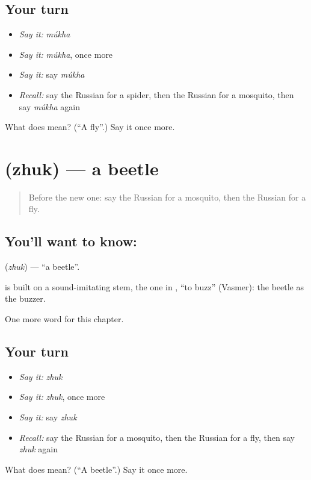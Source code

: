 \subsection*{Your turn}
\begin{itemize}
\raggedright
  \item \emph{Say it:} \emph{múkha}
  \item \emph{Say it:} \emph{múkha}, once more
  \item \emph{Say it:} say \emph{múkha}
  \item \emph{Recall:} say the Russian for a spider, then the Russian for a mosquito, then say \emph{múkha} again
\end{itemize}

\begin{tcolorbox}[breakable,colback=teal!4,colframe=teal!35!black,title={Before you move on}]
What does  mean? (\textquotedblleft{}A fly\textquotedblright{}.) Say it once more.
\end{tcolorbox}
\section[\texorpdfstring{\ru{жук} (zhuk)}{жук (zhuk)}]{ (zhuk) — a beetle}

\label{lesson:RU-C196-zhuk}



\begin{quote}
Before the new one: say the Russian for a mosquito, then the Russian for a fly.
\end{quote}

\subsection*{You'll want to know: }
\textbf{} (\emph{zhuk}) — \textquotedblleft{}a beetle\textquotedblright{}.

\begin{cousinweb}
\textbf{} is built on a sound-imitating stem, the one in \emph{}, \textquotedblleft{}to buzz\textquotedblright{} (Vasmer): the beetle as the buzzer.
\end{cousinweb}

\begin{grammarlens}[title={What you've built}]
One more word for this chapter.
\end{grammarlens}

\subsection*{Your turn}
\begin{itemize}
\raggedright
  \item \emph{Say it:} \emph{zhuk}
  \item \emph{Say it:} \emph{zhuk}, once more
  \item \emph{Say it:} say \emph{zhuk}
  \item \emph{Recall:} say the Russian for a mosquito, then the Russian for a fly, then say \emph{zhuk} again
\end{itemize}

\begin{tcolorbox}[breakable,colback=teal!4,colframe=teal!35!black,title={Before you move on}]
What does  mean? (\textquotedblleft{}A beetle\textquotedblright{}.) Say it once more.
\end{tcolorbox}
